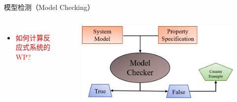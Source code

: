 \documentclass[9pt, CJK]{beamer}
\begin{document}
\begin{frame}
\begin{block}{模型检测（Model Checking）}
\begin{columns}
\begin{itemize}
				\item \textcolor{red}{如何计算反应式系统的WP?}
			\end{itemize}
			\begin{figure}
				\includegraphics[scale=0.35]{figures/MC}
			\end{figure}
		\end{columns}
	\end{block}
	\end{frame}
\end{document}
